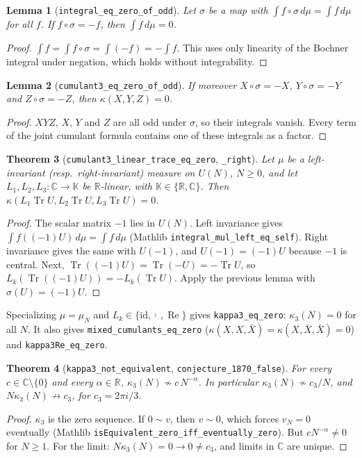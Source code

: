\documentclass[11pt]{article}
\newtheorem{theorem}{Theorem}
\newtheorem{lemma}[theorem]{Lemma}
\theoremstyle{definition}
\newcommand{\Tr}{\operatorname{Tr}}
\begin{document}
\begin{lemma}[\texttt{integral\_eq\_zero\_of\_odd}]
Let $\sigma$ be a map with $\int f\circ\sigma\,d\mu=\int f\,d\mu$ for all $f$. If $f\circ\sigma=-f$, then
$\int f\,d\mu=0$.
\end{lemma}
\begin{proof}
$\int f = \int f\circ\sigma = \int(-f) = -\int f$. This uses only linearity of the Bochner
integral under negation, which holds without integrability.
\end{proof}

\begin{lemma}[\texttt{cumulant3\_eq\_zero\_of\_odd}]
If moreover $X\circ\sigma=-X$, $Y\circ\sigma=-Y$ and $Z\circ\sigma=-Z$, then
$\kappa(X,Y,Z)=0$.
\end{lemma}
\begin{proof}
$XYZ$, $X$, $Y$ and $Z$ are all odd under $\sigma$, so their integrals vanish. Every term of the
joint cumulant formula contains one of these integrals as a factor.
\end{proof}

\begin{theorem}[\texttt{cumulant3\_linear\_trace\_eq\_zero}, \texttt{\_right}]
Let $\mu$ be a left-invariant (resp.\ right-invariant) measure on $U(N)$, $N\ge 0$, and let
$L_1,L_2,L_3:\mathbb{C}\to\mathbb{K}$ be $\mathbb{R}$-linear, with $\mathbb{K}\in\{\mathbb{R},\mathbb{C}\}$.
Then $\kappa(L_1\Tr U, L_2\Tr U, L_3\Tr U)=0$.
\end{theorem}
\begin{proof}
The scalar matrix $-1$ lies in $U(N)$. Left invariance gives $\int f((-1)U)\,d\mu=\int f\,d\mu$
(Mathlib \texttt{integral\_mul\_left\_eq\_self}). Right invariance gives the same with $U(-1)$,
and $U(-1)=(-1)U$ because $-1$ is central. Next, $\Tr((-1)U)=\Tr(-U)=-\Tr U$, so
$L_k(\Tr((-1)U))=-L_k(\Tr U)$. Apply the previous lemma with $\sigma(U)=(-1)U$.
\end{proof}

Specializing $\mu=\mu_N$ and $L_k\in\{\mathrm{id},\overline{\cdot}\,,\operatorname{Re}\}$ gives
\texttt{kappa3\_eq\_zero}: $\kappa_3(N)=0$ for all $N$. It also gives \texttt{mixed\_cumulants\_eq\_zero}
($\kappa(X,X,\bar X)=\kappa(X,\bar X,\bar X)=0$) and \texttt{kappa3Re\_eq\_zero}.

\begin{theorem}[\texttt{kappa3\_not\_equivalent}, \texttt{conjecture\_1870\_false}]
For every $c\in\mathbb{C}\setminus\{0\}$ and every $\alpha\in\mathbb{R}$, $\kappa_3(N)\not\sim c\,N^{-\alpha}$.
In particular $\kappa_3(N)\not\sim c_3/N$, and $N\kappa_3(N)\not\to c_3$, for $c_3=2\pi i/3$.
\end{theorem}
\begin{proof}
$\kappa_3$ is the zero sequence. If $0\sim v$, then $v\sim 0$, which forces $v_N=0$ eventually
(Mathlib \texttt{isEquivalent\_zero\_iff\_eventually\_zero}). But $c N^{-\alpha}\ne 0$ for $N\ge 1$.
For the limit: $N\kappa_3(N)=0\to 0\ne c_3$, and limits in $\mathbb{C}$ are unique.
\end{proof}
\end{document}

